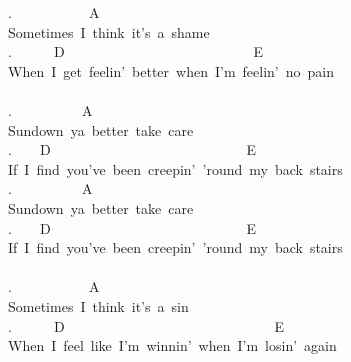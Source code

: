 {.\ \ \ \ \ \ \ \ \ \ \ A\ \ \ \ \ \\
Sometimes\ I\ think\ it's\ a\ shame\\
.\ \ \ \ \ \ D\ \ \ \ \ \ \ \ \ \ \ \ \ \ \ \ \ \ \ \ \ \ \ \ \ \ \ E\\
When\ I\ get\ feelin'\ better\ when\ I'm\ feelin'\ no\ pain\\
\\
.\ \ \ \ \ \ \ \ \ \ A\\
Sundown\ ya\ better\ take\ care\\
.\ \ \ \ D\ \ \ \ \ \ \ \ \ \ \ \ \ \ \ \ \ \ \ \ \ \ \ \ \ \ \ \ E\\
If\ I\ find\ you've\ been\ creepin'\ 'round\ my\ back\ stairs\\
.\ \ \ \ \ \ \ \ \ \ A\\
Sundown\ ya\ better\ take\ care\\
.\ \ \ \ D\ \ \ \ \ \ \ \ \ \ \ \ \ \ \ \ \ \ \ \ \ \ \ \ \ \ \ \ E\\
If\ I\ find\ you've\ been\ creepin'\ 'round\ my\ back\ stairs\\
\\
.\ \ \ \ \ \ \ \ \ \ \ A\\
Sometimes\ I\ think\ it's\ a\ sin\\
.\ \ \ \ \ \ D\ \ \ \ \ \ \ \ \ \ \ \ \ \ \ \ \ \ \ \ \ \ \ \ \ \ \ \ \ \ E\\
When\ I\ feel\ like\ I'm\ winnin'\ when\ I'm\ losin'\ again}
